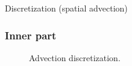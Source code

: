 \documentclass{beamer}
\begin{document}
	\begin{frame}{Discretization (spatial advection)}
	\subsubsection{Inner part}\label{subsubsec:advection-inner}
	\begin{figure}[H] %
	  \caption{Advection discretization.}\label{fig:ADV}
	\end{figure}	
	\end{frame}
\end{document}

